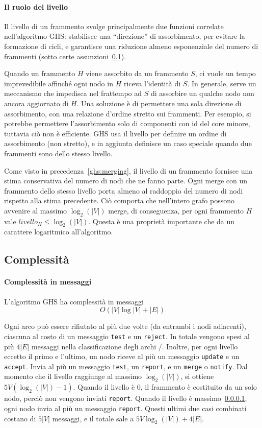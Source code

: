 \documentclass[target=bach,aauheader=,style=]{thud}
\newcommand{\eng}[1]{\foreignlanguage{english}{#1}}
\begin{document}
\paragraph{Il ruolo del livello}\label{ghs:level}
Il livello di un frammento svolge principalmente due funzioni correlate nell'algoritmo GHS: stabilisce una ``direzione'' di assorbimento, per evitare la formazione di cicli, e garantisce una riduzione almeno esponenziale del numero di frammenti (sotto certe assunzioni~\ref{ghs:complexity}).

Quando un frammento $H$ viene assorbito da un frammento $S$, ci vuole un tempo imprevedibile affinché ogni nodo in $H$ riceva l'identità di $S$. In generale, serve un meccanismo che impedisca nel frattempo ad $S$ di assorbire un qualche nodo non ancora aggiornato di $H$. Una soluzione è di permettere una sola direzione di assorbimento, con una relazione d'ordine stretto sui frammenti. Per esempio, si potrebbe permettere l'assorbimento solo di componenti con id del core minore, tuttavia ciò non è efficiente. GHS usa il livello per definire un ordine di assorbimento (non stretto), e in aggiunta definisce un caso speciale quando due frammenti sono dello stesso livello.

Come visto in precedenza~\ref{ghs:merging}, il livello di un frammento fornisce una stima conservativa del numero di nodi che ne fanno parte. Ogni \eng{merge} con un frammento dello stesso livello porta almeno al raddoppio del numero di nodi rispetto alla stima precedente. Ciò comporta che nell'intero grafo possono avvenire al massimo $\log_2(|V|)$ \eng{merge}, di conseguenza, per ogni frammento $H$ vale $livello_H\leq\log_2(|V|)$. Questa è una proprietà importante che da un carattere logaritmico all'algoritmo.

\subsection{Complessità}\label{ghs:complexity}

\paragraph{Complessità in messaggi}
L'algoritmo GHS ha complessità in messaggi
$$
O(|V|\log |V|+|E|)
$$

Ogni arco può essere rifiutato al più due volte (da entrambi i nodi adiacenti), ciascuna al costo di un messaggio \lstinline{test} e un \lstinline{reject}. In totale vengono spesi al più $4|E|$ messaggi nella classificazione degli archi \rejected/. Inoltre, per ogni livello eccetto il primo e l'ultimo, un nodo riceve al più un messaggio \lstinline{update} e un \lstinline{accept}. Invia al più un messaggio \lstinline{test}, un \lstinline{report}, e un \lstinline{merge} o \lstinline{notify}. Dal momento che il livello raggiunge al massimo $\log_2(|V|)$, si ottiene $5V(\log_2(|V|)-1)$. Quando il livello è $0$, il frammento è costituito da un solo nodo, perciò non vengono inviati \lstinline{report}. Quando il livello è massimo~\ref{ghs:level}, ogni nodo invia al più un messaggio \lstinline{report}. Questi ultimi due casi combinati costano di $5|V|$ messaggi, e il totale sale a $5V\log_2(|V|)+4|E|$.
\end{document}
